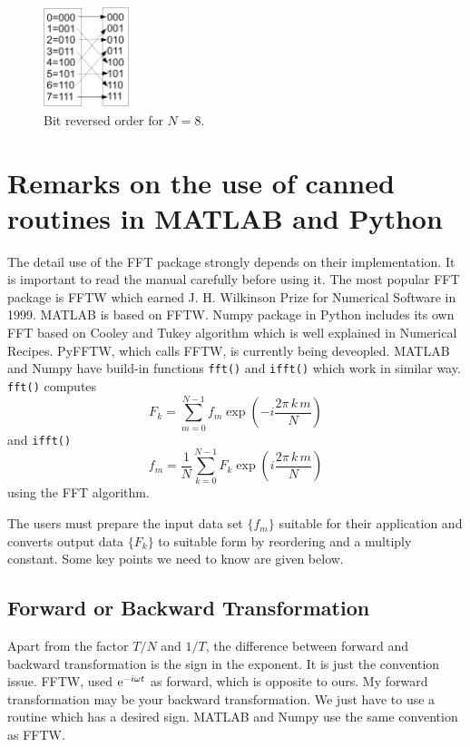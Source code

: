 \begin{figure}
\centering
\includegraphics[width=1in]{11.fft/bit_reversed_order.pdf}
\caption{Bit reversed order for $N=8$.}\label{fig:bit_reversed_order}
\end{figure}

\section{Remarks on the use of canned routines in MATLAB and Python}

The detail use of the FFT package strongly depends on their implementation.  It is important to read the manual carefully before using it. The most popular FFT package is FFTW\cite{FFTW97} which earned J. H. Wilkinson Prize for Numerical Software in 1999. MATLAB is based on FFTW.  Numpy package in Python includes its own FFT based on
Cooley and Tukey algorithm\cite{Cooley1965} which is well explained in Numerical Recipes\cite{numerical_recipes}.
PyFFTW, which calls FFTW, is currently being deveopled.
MATLAB and Numpy have build-in functions \texttt{fft()} and \texttt{ifft()} which work in similar way. \texttt{fft()} computes
\begin{equation}\label{eq:matlab_fft}
F_k = \sum_{m=0}^{N-1} f_m \exp(-i \frac{2\pi\, k\, m}{N})
\end{equation}
and \texttt{ifft()}
\begin{equation}\label{eq:matlab_ifft}
f_m = \frac{1}{N} \sum_{k=0}^{N-1} F_k \exp(i \frac{2\pi\, k\, m}{N})
\end{equation}
using the FFT algorithm. 

The users must prepare the input data set $\{f_m\}$ suitable for their application and converts output data $\{F_k\}$ to suitable form by reordering and a multiply constant. Some key points we need to know are given below.

\subsection{Forward or Backward Transformation}

Apart from the factor $T/N$ and $1/T$, the difference between forward and backward transformation is the sign in the exponent. It is just the convention issue.  FFTW, used $\text{e}^{-i\omega t}$ as forward, which is opposite to ours.    My forward transformation may be your backward transformation. We just have to use a routine which has a desired sign.   MATLAB and Numpy use the same convention as FFTW.

